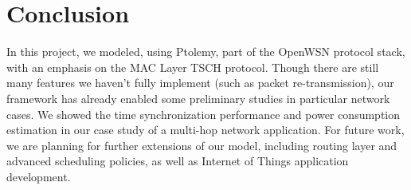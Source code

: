 
\section{Conclusion}
\label{sec:conclusion}

In this project, we modeled, using Ptolemy, part of the OpenWSN protocol stack, with an emphasis on the MAC Layer TSCH protocol. Though there are still many features we haven't fully implement (such as packet re-transmission), our framework has already enabled some preliminary studies in particular network cases. We showed the time synchronization performance and power consumption estimation in our case study of a multi-hop network application. For future work, we are planning for further extensions of our model, including routing layer and advanced scheduling policies, as well as Internet of Things application development.

